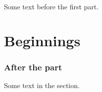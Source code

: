\documentclass{article}
\begin{document}
Some text before the first part.
\part{Beginnings}
\section{After the part}
Some text in the section.
\end{document}
